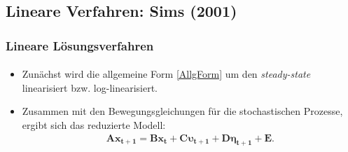 \documentclass[10pt]{beamer}  %
\begin{document}
\subsection{Lineare Verfahren: Sims (2001)}

\begin{frame}\frametitle{Lineare L\"{o}sungsverfahren}\framesubtitle{}
\begin{itemize}
   \item Zun\"{a}chst wird die allgemeine Form \eqref{AllgForm} um den \emph{steady-state} linearisiert bzw. log-linearisiert.
   \item Zusammen mit den Bewegungsgleichungen f\"{u}r die stochastischen Prozesse, ergibt sich das reduzierte Modell:
\begin{align*}
    \mathbf{A} \mathbf{x_{t+1}} =
\mathbf{B} \mathbf{x_t} + \mathbf{C} \boldsymbol{\upsilon_{t+1}} + \mathbf{D}
\boldsymbol{\eta_{t+1}} + \mathbf{E}.
\end{align*}
\end{itemize}
\end{frame}
\end{document}
